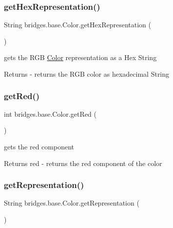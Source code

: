 \subsubsection{\texorpdfstring{get\+Hex\+Representation()}{getHexRepresentation()}}
{\footnotesize\ttfamily String bridges.\+base.\+Color.\+get\+Hex\+Representation (\begin{DoxyParamCaption}{ }\end{DoxyParamCaption})}

gets the R\+GB \mbox{\hyperlink{classbridges_1_1base_1_1_color}{Color}} representation as a Hex String

\begin{DoxyReturn}{Returns}
-\/ returns the R\+GB color as hexadecimal String 
\end{DoxyReturn}
\mbox{\label{classbridges_1_1base_1_1_color_af1a30dc925b35d6bfe609f8838651025}} 
\subsubsection{\texorpdfstring{get\+Red()}{getRed()}}
{\footnotesize\ttfamily int bridges.\+base.\+Color.\+get\+Red (\begin{DoxyParamCaption}{ }\end{DoxyParamCaption})}

gets the red component

\begin{DoxyReturn}{Returns}
red -\/ returns the red component of the color 
\end{DoxyReturn}
\mbox{\label{classbridges_1_1base_1_1_color_a2f9b0cb588e49b2ebf2f015d4d7507d0}} 
\subsubsection{\texorpdfstring{get\+Representation()}{getRepresentation()}}
{\footnotesize\ttfamily String bridges.\+base.\+Color.\+get\+Representation (\begin{DoxyParamCaption}{ }\end{DoxyParamCaption})}

